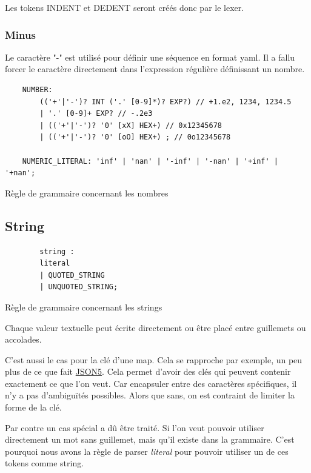 \documentclass[
    iict, %
    il, %
]{heig-tb}
\begin{document}
Les tokens INDENT et DEDENT seront créés donc par le lexer.

\subsubsection{Minus}

Le caractère "-" est utilisé pour définir une séquence en format yaml.
Il a fallu forcer le caractère directement dans l'expression régulière définissant un nombre.

\begin{listing}[!ht]
    \begin{verbatim}
    NUMBER:
        (('+'|'-')? INT ('.' [0-9]*)? EXP?) // +1.e2, 1234, 1234.5
        | '.' [0-9]+ EXP? // -.2e3
        | (('+'|'-')? '0' [xX] HEX+) // 0x12345678
        | (('+'|'-')? '0' [oO] HEX+) ; // 0o12345678

    NUMERIC_LITERAL: 'inf' | 'nan' | '-inf' | '-nan' | '+inf' | '+nan';
    \end{verbatim}
    \caption{Règle de grammaire concernant les nombres}
    \label{number-rule}
\end{listing}

\subsection{String}

\begin{listing}[!ht]
    \begin{verbatim}
        string :
        literal
        | QUOTED_STRING
        | UNQUOTED_STRING;
    \end{verbatim}
    \caption{Règle de grammaire concernant les strings}
    \label{string-rule}
\end{listing}

Chaque valeur textuelle peut écrite directement ou être placé entre guillemets ou accolades.

C'est aussi le cas pour la clé d'une map.
Cela se rapproche par exemple, un peu plus de ce que fait \href{https://json5.org/}{JSON5}.
Cela permet d'avoir des clés qui peuvent contenir exactement ce que l'on veut.
Car encapsuler entre des caractères spécifiques, il n'y a pas d'ambiguïtés possibles. Alors que sans, on est contraint de limiter la forme de la clé.

Par contre un cas spécial a dû être traité. Si l'on veut pouvoir utiliser directement un mot sans guillemet, mais qu'il existe dans la grammaire.
C'est pourquoi nous avons la règle de parser \emph{literal} pour pouvoir utiliser un de ces tokens comme string.
\end{document}
